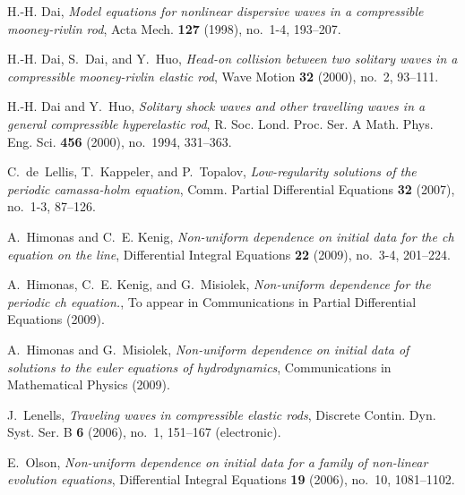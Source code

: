 \documentclass[12pt,reqno]{amsart}
\begin{document}
\begin{thebibliography}{dLKT07}
H.-H. Dai, \emph{Model equations for nonlinear dispersive waves in a
  compressible mooney-rivlin rod}, Acta Mech. \textbf{127} (1998), no.~1-4,
  193--207.

H.-H. Dai, S.~Dai, and Y.~Huo, \emph{Head-on collision between two solitary
  waves in a compressible mooney-rivlin elastic rod}, Wave Motion \textbf{32}
  (2000), no.~2, 93--111.

H.-H. Dai and Y.~Huo, \emph{Solitary shock waves and other travelling waves in
  a general compressible hyperelastic rod}, R. Soc. Lond. Proc. Ser. A Math.
  Phys. Eng. Sci. \textbf{456} (2000), no.~1994, 331--363.

C.~de~Lellis, T.~Kappeler, and P.~Topalov, \emph{Low-regularity solutions of
  the periodic camassa-holm equation}, Comm. Partial Differential Equations
  \textbf{32} (2007), no.~1-3, 87--126.

A.~Himonas and C.~E. Kenig, \emph{Non-uniform dependence on initial data for
  the ch equation on the line}, Differential Integral Equations \textbf{22}
  (2009), no.~3-4, 201--224.

A.~Himonas, C.~E. Kenig, and G.~Misiolek, \emph{Non-uniform dependence for the
  periodic ch equation.}, To appear in Communications in Partial Differential
  Equations (2009).

A.~Himonas and G.~Misiolek, \emph{Non-uniform dependence on initial data of
  solutions to the euler equations of hydrodynamics}, Communications in
  Mathematical Physics (2009).

J.~Lenells, \emph{Traveling waves in compressible elastic rods}, Discrete
  Contin. Dyn. Syst. Ser. B \textbf{6} (2006), no.~1, 151--167 (electronic).

E.~Olson, \emph{Non-uniform dependence on initial data for a family of
  non-linear evolution equations}, Differential Integral Equations \textbf{19}
  (2006), no.~10, 1081--1102.

\end{thebibliography}

%
%
\end{document}
